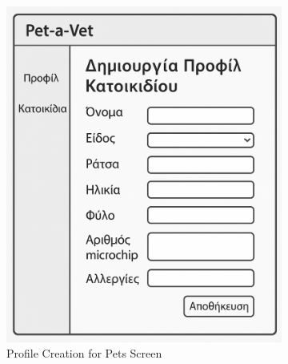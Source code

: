 \documentclass[12pt,a4paper,twoside]{book}
\begin{document}
\begin{figure}[H]
    \centering
    \begin{subfigure}[b]{0.48\textwidth}
        \centering
        \includegraphics[width=\textwidth]{Mockup Screens/Pet_profile.png}
        \caption{Profile Creation for Pets Screen}\label{fig:mockup11}
    \end{subfigure}
    \hfill
    \begin{subfigure}[b]{0.48\textwidth}
        \centering

\end{subfigure}
\end{figure}
\end{document}
